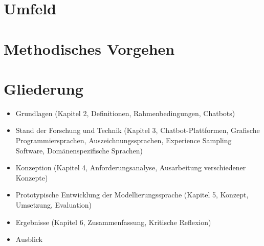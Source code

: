 
\section{Umfeld}

\section{Methodisches Vorgehen}

\section{Gliederung}

\begin{itemize}
\item Grundlagen (Kapitel 2, Definitionen, Rahmenbedingungen, Chatbots)
\item Stand der Forschung und Technik (Kapitel 3, Chatbot-Plattformen, Grafische Programmiersprachen, Auszeichnungssprachen, Experience Sampling Software, Domänenspezifische Sprachen)
\item Konzeption (Kapitel 4, Anforderungsanalyse, Ausarbeitung verschiedener Konzepte)
\item Prototypische Entwicklung der Modellierungssprache (Kapitel 5, Konzept, Umsetzung, Evaluation)
\item Ergebnisse (Kapitel 6, Zusammenfassung, Kritische Reflexion)
\item Ausblick
\end{itemize}